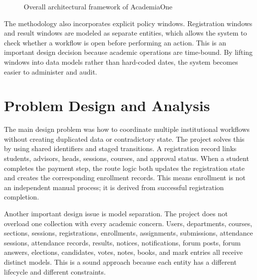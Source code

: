 \documentclass[12pt,a4paper]{report}
\newcommand{\systemName}{AcademiaOne}
\begin{document}
\begin{figure}[H]
  \centering
  \caption{Overall architectural framework of \systemName{}}
  \label{fig:overall-architecture}
\end{figure}

The methodology also incorporates explicit policy windows. Registration windows and result windows are modeled as separate entities, which allows the system to check whether a workflow is open before performing an action. This is an important design decision because academic operations are time-bound. By lifting windows into data models rather than hard-coded dates, the system becomes easier to administer and audit.

\section{Problem Design and Analysis}
The main design problem was how to coordinate multiple institutional workflows without creating duplicated data or contradictory state. The project solves this by using shared identifiers and staged transitions. A registration record links students, advisors, heads, sessions, courses, and approval status. When a student completes the payment step, the route logic both updates the registration state and creates the corresponding enrollment records. This means enrollment is not an independent manual process; it is derived from successful registration completion.

Another important design issue is model separation. The project does not overload one collection with every academic concern. Users, departments, courses, sections, sessions, registrations, enrollments, assignments, submissions, attendance sessions, attendance records, results, notices, notifications, forum posts, forum answers, elections, candidates, votes, notes, books, and mark entries all receive distinct models. This is a sound approach because each entity has a different lifecycle and different constraints.
\end{document}
